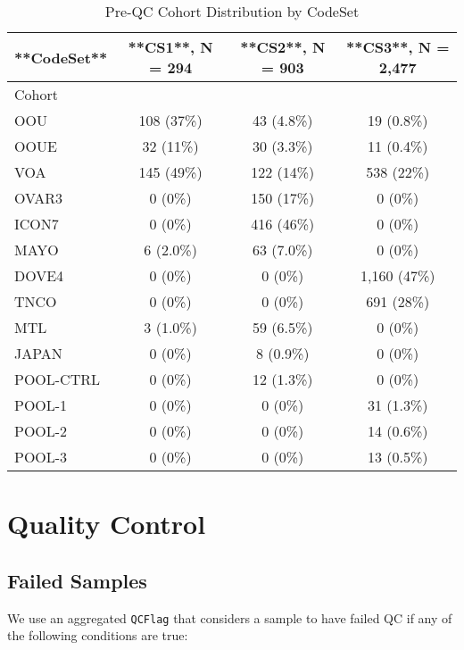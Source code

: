 \documentclass[
]{report}
\begin{document}
\begin{table}

\caption{\label{tab:cohorts-dist}Pre-QC Cohort Distribution by CodeSet}
\centering
\begin{tabular}[t]{l|c|c|c}
\hline
**CodeSet** & **CS1**, N = 294 & **CS2**, N = 903 & **CS3**, N = 2,477\\
\hline
Cohort &  &  & \\
\hline
OOU & 108 (37\%) & 43 (4.8\%) & 19 (0.8\%)\\
\hline
OOUE & 32 (11\%) & 30 (3.3\%) & 11 (0.4\%)\\
\hline
VOA & 145 (49\%) & 122 (14\%) & 538 (22\%)\\
\hline
OVAR3 & 0 (0\%) & 150 (17\%) & 0 (0\%)\\
\hline
ICON7 & 0 (0\%) & 416 (46\%) & 0 (0\%)\\
\hline
MAYO & 6 (2.0\%) & 63 (7.0\%) & 0 (0\%)\\
\hline
DOVE4 & 0 (0\%) & 0 (0\%) & 1,160 (47\%)\\
\hline
TNCO & 0 (0\%) & 0 (0\%) & 691 (28\%)\\
\hline
MTL & 3 (1.0\%) & 59 (6.5\%) & 0 (0\%)\\
\hline
JAPAN & 0 (0\%) & 8 (0.9\%) & 0 (0\%)\\
\hline
POOL-CTRL & 0 (0\%) & 12 (1.3\%) & 0 (0\%)\\
\hline
POOL-1 & 0 (0\%) & 0 (0\%) & 31 (1.3\%)\\
\hline
POOL-2 & 0 (0\%) & 0 (0\%) & 14 (0.6\%)\\
\hline
POOL-3 & 0 (0\%) & 0 (0\%) & 13 (0.5\%)\\
\hline
\end{tabular}
\end{table}

\section{Quality Control}\label{quality-control-1}

\subsection{Failed Samples}\label{failed-samples}

We use an aggregated \texttt{QCFlag} that considers a sample to have failed QC if any of the following conditions are true:
\end{document}

